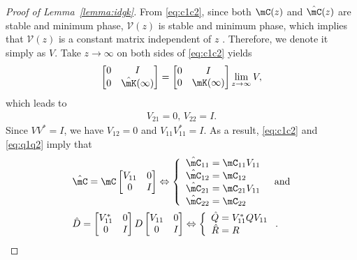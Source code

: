 \begin{proof}[Proof of Lemma~\ref{lemma:idgk}]
  From \eqref{eq:c1c2}, since both $\mC(z)$ and $\hat \mC(z)$ are stable and minimum phase, $\mathcal V(z)$ is stable and minimum phase, which implies that $\mathcal V(z)$ is a constant matrix independent of $z$ \cite{anderson, hayden}. Therefore, we denote it simply as $V$. Take $z\rightarrow\infty$ on both sides of \eqref{eq:c1c2} yields
  \begin{equation}
    \begin{bmatrix}
      0 & I \\
      0 & \hat \mK(\infty) 
    \end{bmatrix}= \begin{bmatrix}
      0 & I \\
      0 & \mK(\infty)
    \end{bmatrix}\lim_{z\rightarrow\infty}V,
  \end{equation}
  which leads to 
  \begin{align}
    V_{21}=0,\, V_{22}=I.
  \end{align}
  Since $VV^* = I$, we have $V_{12} = 0$ and $V_{11}V_{11}^* = I$. As a result, \eqref{eq:c1c2} and \eqref{eq:q1q2} imply that
  \begin{equation}
    \begin{aligned}
      &\hat\mC=\mC\begin{bmatrix}V_{11} & 0 \\ 0 & I \end{bmatrix}
      \Leftrightarrow\left\{
        \begin{array}{r@{\;=\;}l}
          \hat\mC_{11} & \mC_{11} V_{11}\\
          \hat\mC_{12} & \mC_{12} \\
          \hat\mC_{21} & \mC_{21}V_{11}\\ 
          \hat\mC_{22} & \mC_{22} 
        \end{array}
      \right. ~~\text{and}\\
      &\hat{D}=\begin{bmatrix}V^*_{11} & 0 \\ 0 & I \end{bmatrix}D\begin{bmatrix}V_{11} & 0 \\ 0 & I \end{bmatrix}
      \Leftrightarrow\left\{
        \begin{array}{r@{\;=\;}l}
          \hat{Q} & V^*_{11}QV_{11}\\
          \hat{R} & R
        \end{array}\right..

\end{aligned}
\end{equation}
\end{proof}
